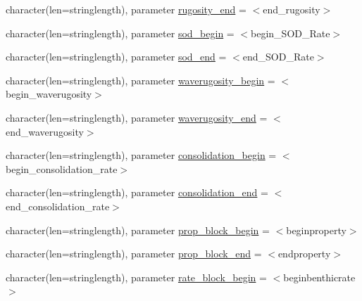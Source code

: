 \begin{DoxyCompactItemize}
\item 
character(len=stringlength), parameter \mbox{\hyperlink{namespacemoduleinterfacesedimentwater_a37d7fe80d43f9e36fa72e670b7f99661}{rugosity\+\_\+end}} = \textquotesingle{}$<$end\+\_\+rugosity$>$\textquotesingle{}
\item 
character(len=stringlength), parameter \mbox{\hyperlink{namespacemoduleinterfacesedimentwater_ae7ff52be4d3debefd5ba655c95bc515c}{sod\+\_\+begin}} = \textquotesingle{}$<$begin\+\_\+\+S\+O\+D\+\_\+\+Rate$>$\textquotesingle{}
\item 
character(len=stringlength), parameter \mbox{\hyperlink{namespacemoduleinterfacesedimentwater_a2391be2a5f13e4a8faaaa7d0ceb67473}{sod\+\_\+end}} = \textquotesingle{}$<$end\+\_\+\+S\+O\+D\+\_\+\+Rate$>$\textquotesingle{}
\item 
character(len=stringlength), parameter \mbox{\hyperlink{namespacemoduleinterfacesedimentwater_ae6bb00c8980ce7d2e0f3599df39e525f}{waverugosity\+\_\+begin}} = \textquotesingle{}$<$begin\+\_\+waverugosity$>$\textquotesingle{}
\item 
character(len=stringlength), parameter \mbox{\hyperlink{namespacemoduleinterfacesedimentwater_a42061fb11ef02654e183649e5e48dc1b}{waverugosity\+\_\+end}} = \textquotesingle{}$<$end\+\_\+waverugosity$>$\textquotesingle{}
\item 
character(len=stringlength), parameter \mbox{\hyperlink{namespacemoduleinterfacesedimentwater_a1dcccf67e2359074afcdf0aa1e69f308}{consolidation\+\_\+begin}} = \textquotesingle{}$<$begin\+\_\+consolidation\+\_\+rate$>$\textquotesingle{}
\item 
character(len=stringlength), parameter \mbox{\hyperlink{namespacemoduleinterfacesedimentwater_a7ae3568b82a4f70849648975b65d7dfc}{consolidation\+\_\+end}} = \textquotesingle{}$<$end\+\_\+consolidation\+\_\+rate$>$\textquotesingle{}
\item 
character(len=stringlength), parameter \mbox{\hyperlink{namespacemoduleinterfacesedimentwater_a544c3414c82d7e0289f216d5ad6c7299}{prop\+\_\+block\+\_\+begin}} = \textquotesingle{}$<$beginproperty$>$\textquotesingle{}
\item 
character(len=stringlength), parameter \mbox{\hyperlink{namespacemoduleinterfacesedimentwater_a4021d17f3a718269c43fde1c7967b12a}{prop\+\_\+block\+\_\+end}} = \textquotesingle{}$<$endproperty$>$\textquotesingle{}
\item 
character(len=stringlength), parameter \mbox{\hyperlink{namespacemoduleinterfacesedimentwater_aed70983784ad7096657498952a181f00}{rate\+\_\+block\+\_\+begin}} = \textquotesingle{}$<$beginbenthicrate$>$\textquotesingle{}

\end{DoxyCompactItemize}
